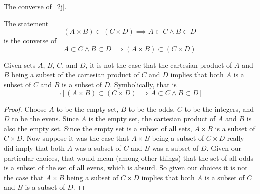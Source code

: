 \documentclass[main.tex]{subfiles}
\begin{document}
\subproblem{}\label{2k}
The converse of~\ref{2j}.
\begin{remark}
	The statement
	\[(A \times B) \subset (C \times D) \implies A \subset C \land B \subset D\]
	is the converse of
	\[A \subset C \land B \subset D \implies (A \times B) \subset (C \times D)\]
\end{remark}

\begin{thm}
	Given sets \(A\), \(B\), \(C\), and \(D\), it is not the case that the
	cartesian product of \(A\) and \(B\) being a subset of the cartesian
	product of \(C\) and \(D\) implies that both \(A\) is a subset of \(C\)
	and \(B\) is a subset of \(D\). Symbolically, that is
	\[\neg [(A \times B) \subset (C \times D) \implies A \subset C \land B \subset D]\]
\end{thm}
\begin{proof}
	Choose \(A\) to be the empty set, \(B\) to be the odds, \(C\)
	to be the integers, and \(D\) to be the evens. Since \(A\) is the empty
	set, the cartesian product of \(A\) and \(B\) is also the empty set.
	Since the empty set is a subset of all sets, \(A \times B\) is a subset
	of \(C \times D\). Now suppose it was the case that \(A \times B\) being
	a subset of \(C \times D\) really did imply that both \(A\) was a subset
	of \(C\) and \(B\) was a subset of \(D\). Given our particular choices,
	that would mean (among other things) that the set of all odds is a
	subset of the set of all evens, which is absurd. So given our choices it
	is not the case that \(A \times B\) being a subset of \(C \times D\)
	implies that both \(A\) is a subset of \(C\) and \(B\) is a subset of
	\(D\).
\end{proof}
\end{document}
